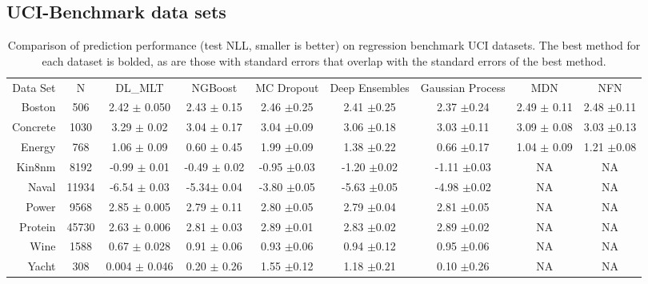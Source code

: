 \documentclass[a4paper,conference]{IEEEtran}
\begin{document}
\subsection{UCI-Benchmark data sets}
\begin{table*}[!t]
\renewcommand{\arraystretch}{1.3}
\caption{Comparison of prediction performance (test NLL, smaller is better)  on regression benchmark UCI datasets. The best method for each dataset is bolded, as are those with standard errors that overlap with the standard errors of the best method.}
\label{table_example}


\centering
\begin{tabular}{rcccccccc}
Data Set & N & DL\_MLT & NGBoost & MC Dropout & Deep Ensembles & Gaussian Process & MDN & NFN \\
Boston & 506 & 2.42 $\pm$ 0.050 & 2.43 $\pm$ 0.15 & 2.46 $\pm$0.25 & 2.41 $\pm$0.25 & 2.37 $\pm$0.24 & 2.49 $\pm$ 0.11 & 2.48 $\pm$0.11 \\
Concrete & 1030 & 3.29 $\pm$ 0.02 & 3.04 $\pm$ 0.17 & 3.04 $\pm$0.09 & 3.06 $\pm$0.18 & 3.03 $\pm$0.11 & 3.09 $\pm$ 0.08 & 3.03 $\pm$0.13 \\
Energy & 768 & 1.06 $\pm$ 0.09 & 0.60 $\pm$ 0.45 & 1.99 $\pm$0.09 & 1.38 $\pm$0.22 & 0.66 $\pm$0.17 & 1.04 $\pm$ 0.09 & 1.21 $\pm$0.08 \\
Kin8nm & 8192 & -0.99 $\pm$ 0.01 & -0.49 $\pm$ 0.02 & -0.95 $\pm$0.03 & -1.20 $\pm$0.02 & -1.11 $\pm$0.03 & NA & NA \\
Naval & 11934 & -6.54 $\pm$ 0.03 & -5.34$\pm$ 0.04 & -3.80 $\pm$0.05 & -5.63 $\pm$0.05 & -4.98 $\pm$0.02 & NA & NA \\
Power & 9568 & 2.85 $\pm$ 0.005 & 2.79 $\pm$ 0.11 & 2.80 $\pm$0.05 & 2.79 $\pm$0.04 & 2.81 $\pm$0.05 & NA & NA \\
Protein & 45730 & 2.63 $\pm$ 0.006 & 2.81 $\pm$ 0.03 & 2.89 $\pm$0.01 & 2.83 $\pm$0.02 & 2.89 $\pm$0.02 & NA & NA \\
Wine & 1588 & 0.67 $\pm$ 0.028 & 0.91 $\pm$ 0.06 & 0.93 $\pm$0.06 & 0.94 $\pm$0.12 & 0.95 $\pm$0.06 & NA & NA \\
Yacht & 308 & 0.004 $\pm$ 0.046 & 0.20 $\pm$ 0.26 & 1.55 $\pm$0.12 & 1.18 $\pm$0.21 & 0.10 $\pm$0.26 & NA & NA \\
\end{tabular}


\end{table*}
\end{document}
